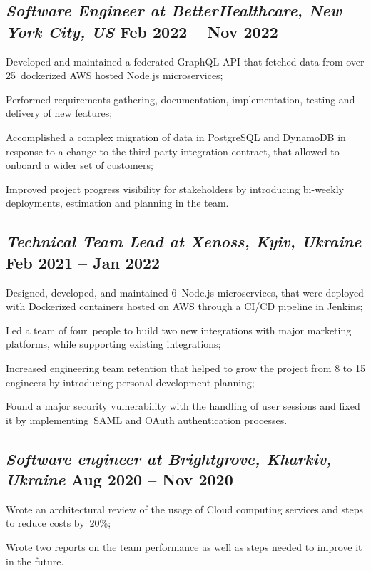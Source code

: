 \documentclass[a4paper,12pt]{book}
\begin{document}
\subsection{{\sl\bf\hspace{0.1in}Software Engineer at BetterHealthcare,  New York City, US} \hfill Feb 2022 -- Nov 2022}
\begin{zitemize}
\item Developed and maintained a federated GraphQL API that fetched data from over 25~dockerized AWS hosted Node.js microservices;
\item Performed requirements gathering, documentation, implementation, testing and delivery of new features;
\item Accomplished a complex migration of data in PostgreSQL and DynamoDB in response to a change to the third party integration contract, that allowed to onboard a wider set of customers; 
\item Improved project progress visibility for stakeholders by introducing bi-weekly deployments, estimation and planning in the team.
\end{zitemize}

\subsection{{\sl\bf\hspace{0.1in}Technical Team Lead at Xenoss, Kyiv, Ukraine } \hfill Feb 2021 -- Jan 2022}
\begin{zitemize}
 \item Designed, developed, and maintained 6~Node.js microservices, that were deployed with Dockerized containers hosted on AWS through a CI/CD pipeline in Jenkins;
 \item Led a team of four~people to build two new integrations with major marketing platforms, while supporting existing integrations;
 \item Increased engineering team retention that helped to grow the project from 8 to 15 engineers by introducing personal development planning;
 \item Found a major security vulnerability with the handling of user sessions and fixed it by implementing~SAML and OAuth authentication processes.
\end{zitemize}

\subsection{{\sl\bf\hspace{0.1in}Software engineer at Brightgrove, Kharkiv, Ukraine } \hfill Aug 2020 -- Nov 2020}
\begin{zitemize}
 \item Wrote an architectural review of the usage of Cloud computing services and steps to reduce costs by~20\%;
 \item Wrote two reports on the team performance as well as steps needed to improve it in the future.
\end{zitemize}
\end{document}
